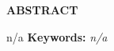 \begin{center}
{\bf ABSTRACT}\\[36pt]
\end{center}
{\baselineskip
n/a
}
\bigskip
\textbf{Keywords:} \textit{n/a}
